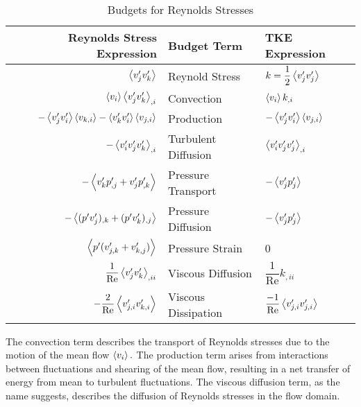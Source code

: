 \begin {table}[H]
\centering  \caption{Budgets for Reynolds Stresses}
\label{tbl:rs-budgets}
\begin{tabular}{| r | l | l |}
\hline
\textbf{Reynolds Stress Expression} & \textbf{Budget Term} & \textbf{TKE Expression}\\
\hline
$\expval{v'_jv'_k}$                                                     & Reynold Stress      & $k=\dfrac{1}{2}\expval{v'_jv'_j}$               \\[0.5em]
$\expval{v_i}\expval{v'_jv'_k}_{,i}$                                    & Convection          & $\expval{v_i}k_{,i}$                            \\[0.5em]
$-\expval{v'_j v'_i}\expval{v_{k,i}}-\expval{v'_k v'_i}\expval{v_{j,i}}$& Production          & $-\expval{v'_jv'_i}\expval{v_{j,i}}$            \\[0.5em]
$-\expval{v'_i v'_j v'_k}_{,i}$                                         & Turbulent Diffusion & $\expval{v'_iv'_jv'_j}_{,i}$                    \\[0.5em]
$-\expval{v'_kp'_{,j} + v'_jp'_{,k}}$                                   & Pressure Transport  & $-\expval{v'_jp'_j}$                            \\[0.5em]
$-\expval{(p'v'_j)_{,k} + (p'v'_k)_{,j}}$                               & Pressure Diffusion  & $-\expval{v'_jp'_j}$                            \\[0.5em]
$\expval{p'(v'_{j,k}+v'_{k,j})}$                                        & Pressure Strain     & 0                                               \\[0.5em]
$\dfrac{1}{\text{Re}}\expval{v'_j v'_k}_{,ii}$                          & Viscous Diffusion   & $\dfrac{1}{\text{Re}}k_{,ii}$                   \\[0.5em]
$- \dfrac{2}{\text{Re}}\expval{v'_{j,i}v'_{k,i}}$                       & Viscous Dissipation & $\dfrac{-1}{\text{Re}}\expval{v'_{j,i}v'_{j,i}}$\\[0.5em]
\hline
\end{tabular}	
\end{table}

The convection term describes the transport of Reynolds stresses due to the motion of the mean flow $\expval{v_i}.$ The production term arises from interactions between fluctuations and shearing of the mean flow, resulting in a net transfer of energy from mean to turbulent fluctuations. The viscous diffusion term, as the name suggests, describes the diffusion of Reynolds stresses in the flow domain.
